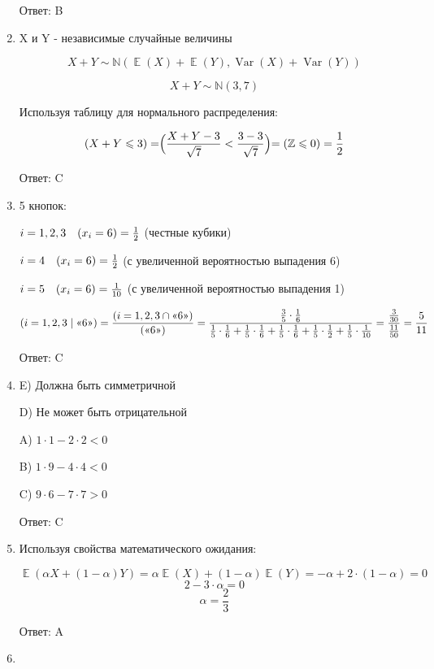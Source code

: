\documentclass[a4paper]{article} %
\DeclareMathOperator{\Var}{Var}
\DeclareMathOperator{\E}{\mathbb{E}}
\let\P\relax
\DeclareMathOperator{\P}{\mathbb{P}}
\newcommand \N{\mathbb{N}}
\newcommand \Z{\mathbb{Z}}
\renewcommand{\leq}{\leqslant}
\begin{document}
\begin{enumerate}
    Ответ: B

    \item

    X и Y - независимые случайные величины

    \[X + Y \sim \N(\E(X) + \E(Y), \Var(X) + \Var(Y))\]

    \[X + Y \sim \N(3,7)\]
    
    Используя таблицу для нормального распределения:

    \[\P(X + Y\leq 3) = \P\Bigr(\frac{X+Y-3}{\sqrt{7}} < \frac{3-3}{\sqrt{7}}\Bigl) = (\Z\leq 0) = \frac{1}{2}\]

    Ответ: C

    \item

    5 кнопок:

    $i=1,2,3 \quad \P(x_i = 6) =\frac{1}{2}$ (честные кубики)

    $i=4 \quad \P(x_i = 6) =\frac{1}{2}$ (с увеличенной вероятностью выпадения 6)

    $i=5 \quad \P(x_i = 6) =\frac{1}{10}$ (с увеличенной вероятностью выпадения 1)

    \[\P(i=1,2,3\mid \text{<<6>>}) = \frac{\P(i=1,2,3\cap \text{<<6>>})}{\P(\text{<<6>>})} = \frac{\frac{3}{5}\cdot \frac{1}{6}}{\frac{1}{5}\cdot \frac{1}{6} + \frac{1}{5}\cdot \frac{1}{6} + \frac{1}{5}\cdot \frac{1}{6} + \frac{1}{5}\cdot \frac{1}{2} + \frac{1}{5}\cdot \frac{1}{10}} = \frac{\frac{3}{30}}{\frac{11}{50}} = \frac{5}{11} \]

    Ответ: C

    \item


    E) Должна быть симметричной

    D) Не может быть отрицательной

    A) $1\cdot1 - 2\cdot2 < 0$

    B) $1\cdot9 - 4\cdot4 < 0$

    C) $9\cdot6 - 7\cdot7 > 0$

    Ответ: C

    \item
    
    Используя свойства математического ожидания:

    \[\E(\alpha X + (1 - \alpha)Y) = \alpha \E(X) + (1-\alpha) \E(Y) = -\alpha + 2\cdot(1-\alpha) = 0\]
    \[2 - 3\cdot\alpha = 0\]
    \[\alpha = \frac{2}{3}\]

    Ответ: A

    \item
    

\end{enumerate}
\end{document}
